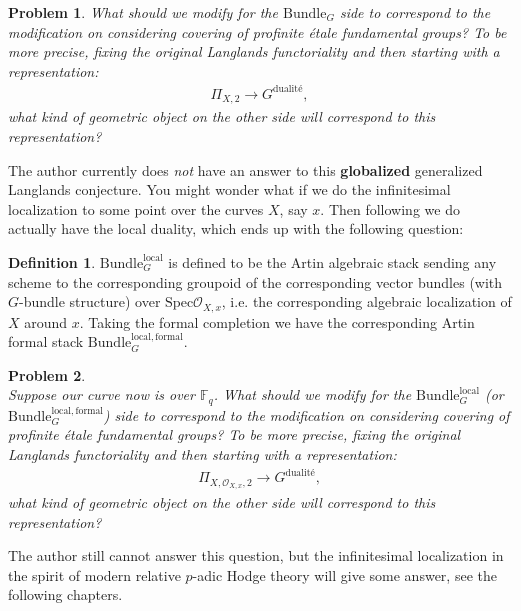 \documentclass[12pt]{book}
\newtheorem{problem}{Problem}
\theoremstyle{definition}
\newtheorem{definition}{Definition}
\begin{document}
\begin{problem}
What should we modify for the $\mathrm{Bundle}_G$ side to correspond to the modification on considering covering of profinite \'etale fundamental groups? To be more precise, fixing the original Langlands functoriality and then starting with a representation:
\begin{align}
\Pi_{X,2} \rightarrow G^\text{dualit\'e},
\end{align}
what kind of geometric object on the other side will correspond to this representation? 
\end{problem}
The author currently does \textit{not} have an answer to this \textbf{globalized} generalized Langlands conjecture. You might wonder what if we do the infinitesimal localization to some point over the curves $X$, say $x$. Then following \cite{GL} we do actually have the local duality, which ends up with the following question:


\begin{definition}
$\mathrm{Bundle}^\mathrm{local}_G$ is defined to be the Artin algebraic stack sending any scheme to the corresponding groupoid of the corresponding vector bundles (with $G$-bundle structure) over $\mathrm{Spec}\mathcal{O}_{X,x}$, i.e. the corresponding algebraic localization of $X$ around $x$. Taking the formal completion we have the corresponding Artin formal stack $\mathrm{Bundle}^\mathrm{local,formal}_G$.
\end{definition}



\begin{problem}\mbox{}\\
Suppose our curve now is over $\mathbb{F}_q$. What should we modify for the $\mathrm{Bundle}^\mathrm{local}_G$ (or $\mathrm{Bundle}^\mathrm{local,formal}_G$) side to correspond to the modification on considering covering of profinite \'etale fundamental groups? To be more precise, fixing the original Langlands functoriality and then starting with a representation:
\begin{align}
\Pi_{X,\mathcal{O}_{X,x},2} \rightarrow G^\text{dualit\'e},
\end{align}
what kind of geometric object on the other side will correspond to this representation? 
\end{problem}

The author still cannot answer this question, but the infinitesimal localization in the spirit of modern relative $p$-adic Hodge theory will give some answer, see the following chapters.
\end{document}
